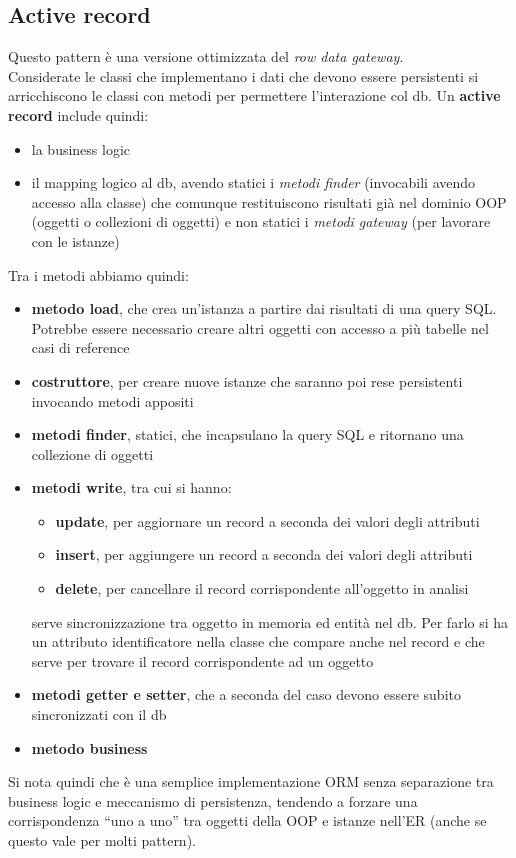 \documentclass[a4paper,12pt, oneside]{book}
\begin{document}
\subsection{Active record}
Questo pattern è una versione ottimizzata del \textit{row data gateway}.\\
Considerate le classi che implementano i dati che devono essere persistenti si
arricchiscono le classi con metodi per permettere l'interazione col db.
Un \textbf{active record} include quindi:
\begin{itemize}
  \item la business logic
  \item il mapping logico al db, avendo statici i \textit{metodi finder}
  (invocabili avendo accesso alla classe) che comunque restituiscono risultati
  già nel dominio OOP (oggetti o collezioni di oggetti) e non statici i
  \textit{metodi gateway} (per lavorare con le istanze)
\end{itemize}
Tra i metodi abbiamo quindi:
\begin{itemize}
  \item \textbf{metodo load}, che crea un'istanza a partire dai risultati di una
  query SQL. Potrebbe essere necessario creare altri oggetti con accesso a più
  tabelle nel casi di reference
  \item \textbf{costruttore}, per creare nuove istanze che saranno poi rese
  persistenti invocando metodi appositi
  \item \textbf{metodi finder}, statici, che incapsulano la query SQL e
  ritornano una collezione di oggetti
  \item \textbf{metodi write}, tra cui si hanno:
  \begin{itemize}
    \item \textbf{update}, per aggiornare un record a seconda dei valori degli
    attributi 
    \item \textbf{insert}, per aggiungere un record a seconda dei valori degli
    attributi 
    \item \textbf{delete}, per cancellare il record corrispondente all'oggetto
    in analisi
  \end{itemize}
  serve sincronizzazione tra oggetto in memoria ed entità nel db. Per farlo si
  ha un attributo identificatore nella classe che compare anche nel record e che
  serve per trovare il record corrispondente ad un oggetto
  \item \textbf{metodi getter e setter}, che a seconda del caso devono essere
  subito sincronizzati con il db
  \item \textbf{metodo business}
\end{itemize}
Si nota quindi che è una semplice implementazione ORM senza separazione tra
business logic e meccanismo di persistenza, tendendo a forzare una
corrispondenza ``uno a uno'' tra oggetti della OOP e istanze nell'ER (anche se
questo vale per molti pattern).
\end{document}
